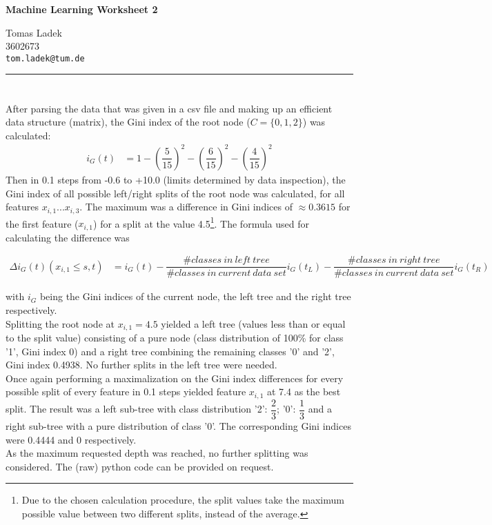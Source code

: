 \documentclass[11pt]{article}
\makeatletter
\newcommand{\exercise}{\section{}}
\newcommand{\hwhead}[4]{
\begin{center}
\sffamily\large\bfseries Machine Learning Worksheet #1
\vspace{2mm}
\normalfont

#2\\
#3\\
\texttt{#4}
\end{center}
\vspace{6mm} \hrule \vspace{4mm}
}
\newcommand{\names}{Tomas Ladek} %
\newcommand{\imats}{3602673} %
\newcommand{\emails}{tom.ladek@tum.de} %
\makeatother
\begin{document}
\hwhead{2}{\names}{\imats}{\emails}


\exercise
After parsing the data that was given in a csv file and making up an efficient data structure (matrix), the Gini index of the root node ($C = \{0, 1, 2\}$) was calculated:
\begin{align*}
	i_G(t) &= 1 - (\dfrac{5}{15})^2 - (\dfrac{6}{15})^2 - (\dfrac{4}{15})^2
\end{align*}
Then in 0.1 steps from -0.6 to +10.0 (limits determined by data inspection), the Gini index of all possible left/right splits of the root node was calculated, for all features $x_{i,1}...x_{i,3}$. The maximum was a difference in Gini indices of $\approx0.3615$ for the first feature ($x_{i,1}$) for a split at the value 4.5\footnote{Due to the chosen calculation procedure, the split values take the maximum possible value between two different splits, instead of the average.}. The formula used for calculating the difference was

\begin{align*}
	\Delta i_G(t) (x_{i,1} \le s, t) &= i_G(t) - \dfrac{ \#classes\ in\ left\ tree}{\#classes\ in\ current\ data\ set}i_G(t_L) - \dfrac{ \#classes\ in\ right\ tree}{\#classes\ in\ current\ data\ set}i_G(t_R)
\end{align*}

with $i_G$ being the Gini indices of the current node, the left tree and the right tree respectively.\\

Splitting the root node at $x_{i,1} = 4.5$ yielded a left tree (values less than or equal to the split value) consisting of a pure node (class distribution of 100\% for class '1', Gini index 0) and a right tree combining the remaining classes '0' and '2', Gini index 0.4938. No further splits in the left tree were needed.\\

 Once again performing a maximalization on the Gini index differences for every possible split of every feature in 0.1 steps yielded feature $x_{i,1}$ at 7.4 as the best split. The result was a left sub-tree with class distribution '2': $\dfrac{2}{3}$; '0': $\dfrac{1}{3}$ and a right sub-tree with a pure distribution of class '0'. The corresponding Gini indices were 0.4444 and 0 respectively.\\
 
 As the maximum requested depth was reached, no further splitting was considered. The (raw) python code can be provided on request.
 
\end{document}
